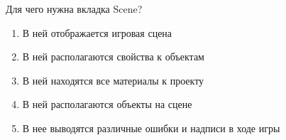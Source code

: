 
Для чего нужна вкладка Scene?

\begin{enumerate}
    \item В ней отображается игровая сцена
    \item В ней располагаются свойства к объектам
    \item В ней находятся все материалы к проекту
    \item В ней располагаются объекты на сцене
    \item В нее выводятся различные ошибки и надписи в ходе игры
\end{enumerate}

